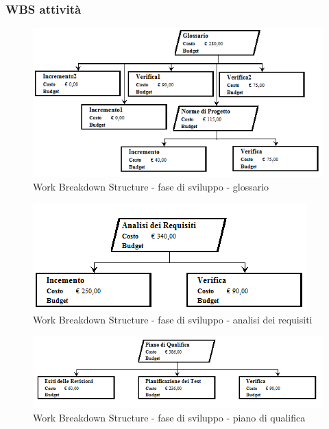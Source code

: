 \documentclass[a4paper]{article}
\begin{document}
			\subsubsection{WBS attività}
				\begin{figure}[H]
					\centering
					\includegraphics[width=\textwidth]{wbs/wbs_sviluppo_1}
					\caption{Work Breakdown Structure - fase di sviluppo - glossario}
				\end{figure}
				\begin{figure}[H]
					\centering
					\includegraphics[width=\textwidth]{wbs/wbs_sviluppo_2}
					\caption{Work Breakdown Structure - fase di sviluppo - analisi dei requisiti}
				\end{figure}
				\begin{figure}[H]
					\centering
					\includegraphics[width=\textwidth]{wbs/wbs_sviluppo_3}
					\caption{Work Breakdown Structure - fase di sviluppo - piano di qualifica}
				\end{figure}
\end{document}
